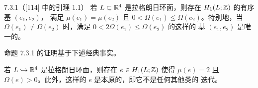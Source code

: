 \begin{wprop}{7.3.1（[114] 中的引理 1.1）}
  若 $L\subset\mathbb{R}^4$ 是拉格朗日环面，则存在 $H_1(L;\mathbb{Z})$ 的有序基 $(e_1,e_2)$，
  满足 $\mu(e_1)=\mu(e_2)$ 且 $0<\Omega(e_1)\le\Omega(e_2)$。特别地，当
  $\Omega(e_1)\ne\Omega(e_2)$ 时，满足 $0<2\Omega(e_1)\le\Omega(e_2)$ 的这样的
  基 $(e_1,e_2)$ 是唯一的。
\end{wprop}

命题 7.3.1 的证明基于下述经典事实。

若
$L\hookrightarrow\mathbb{R}^4$ 是拉格朗日环面，则存在 $e\in H_1(L;\mathbb{Z})$ 使得
$\mu(e)=2$ 且 $\Omega(e)>0$。此外，这样的 $e$ 是本原的，即它不是任何其他类的
迭代。


